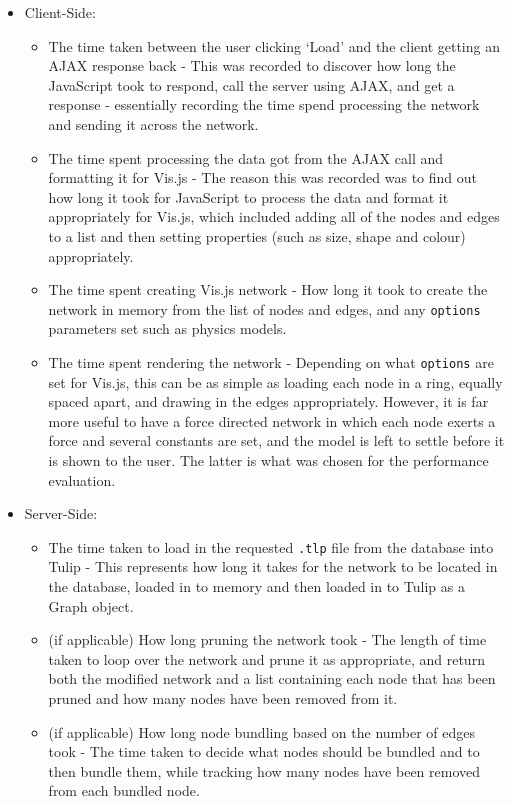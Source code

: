 \documentclass[../dissertation.tex]{subfiles}
\begin{document}
\begin{itemize}
    \item Client-Side:
    \begin{itemize}
        \item The time taken between the user clicking `Load' and the client getting an AJAX response back - This was recorded to discover how long the JavaScript took to respond, call the server using AJAX, and get a response - essentially recording the time spend processing the network and sending it across the network.
        \item The time spent processing the data got from the AJAX call and formatting it for Vis.js - The reason this was recorded was to find out how long it took for JavaScript to process the data and format it appropriately for Vis.js, which included adding all of the nodes and edges to a list and then setting properties (such as size, shape and colour) appropriately.
        \item The time spent creating Vis.js network - How long it took to create the network in memory from the list of nodes and edges, and any \texttt{options} parameters set such as physics models.
        \item The time spent rendering the network - Depending on what \texttt{options} are set for Vis.js, this can be as simple as loading each node in a ring, equally spaced apart, and drawing in the edges appropriately. However, it is far more useful to have a force directed network in which each node exerts a force and several constants are set, and the model is left to settle before it is shown to the user. The latter is what was chosen for the performance evaluation.
    \end{itemize}
    \item Server-Side:
    \begin{itemize}
        \item The time taken to load in the requested \texttt{.tlp} file from the database into Tulip - This represents how long it takes for the network to be located in the database, loaded in to memory and then loaded in to Tulip as a Graph object.
        \item (if applicable) How long pruning the network took - The length of time taken to loop over the network and prune it as appropriate, and return both the modified network and a list containing each node that has been pruned and how many nodes have been removed from it.
        \item (if applicable) How long node bundling based on the number of edges took - The time taken to decide what nodes should be bundled and to then bundle them, while tracking how many nodes have been removed from each bundled node.

\end{itemize}
\end{itemize}
\end{document}
